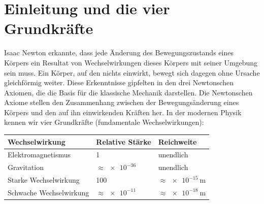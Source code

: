 \section{Einleitung und die vier Grundkräfte}\label{sec: dynamik_einleitung}
Isaac Newton erkannte, dass jede Änderung des Bewegungszustands eines Körpers ein Resultat von Wechselwirkungen dieses Körpers mit seiner Umgebung sein muss. Ein Körper, auf den nichts einwirkt, bewegt sich dagegen ohne Ursache gleichförmig weiter. Diese Erkenntnisse gipfelten in den drei Newtonschen Axiomen, die die Basis für die klassische Mechanik darstellen. Die Newtonschen Axiome stellen den Zusammenhang zwischen der Bewegungsänderung eines Körpers und den auf ihn einwirkenden Kräften her. In der modernen Physik kennen wir vier Grundkräfte (fundamentale Wechselwirkungen):
\begin{table}[htbp]
    \centering
    \begin{tabular}{l l l}
        \toprule
        \textbf{Wechselwirkung} & \textbf{Relative Stärke} & \textbf{Reichweite} \\
        \midrule
        Elektromagnetismus & \num{1} & unendlich \\
        Gravitation & $\approx \SI{e-36}{}$ & unendlich \\
        Starke Wechselwirkung & \num{100} & $\approx \SI{e-15}{\meter}$ \\
        Schwache Wechselwirkung & $\approx \SI{e-11}{} $ & $\approx \SI{e-18}{\meter}$ \\
        \bottomrule
    \end{tabular}\label{tab: vier_grundkraefte_der_physik}
\end{table}

